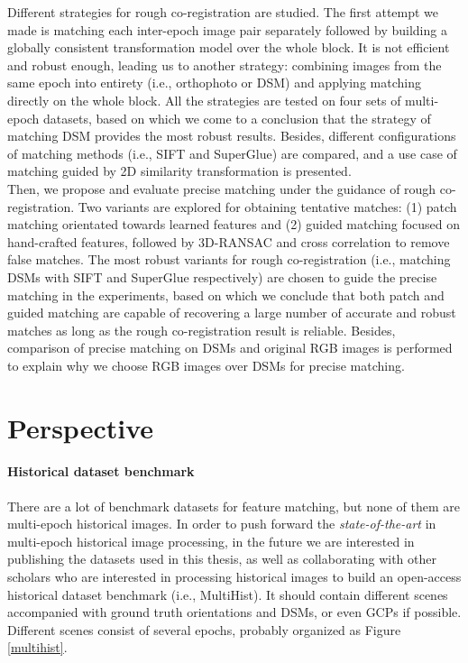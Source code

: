 Different strategies for rough co-registration are studied. The first attempt we made is matching each inter-epoch image pair separately followed by building a globally consistent transformation model over the whole block. It is not efficient and robust enough, leading us to another strategy: combining images from the same epoch into entirety (i.e., orthophoto or \ac{DSM}) and applying matching directly on the whole block. All the strategies are tested on four sets of multi-epoch datasets, based on which we come to a conclusion that the strategy of matching \ac{DSM} provides the most robust results. Besides, different configurations of matching methods (i.e., SIFT and SuperGlue) are compared, and a use case of matching guided by 2D similarity transformation is presented.\\

Then, we propose and evaluate precise matching under the guidance of rough co-registration. Two variants are explored for obtaining tentative matches: (1) patch matching orientated towards learned features and (2) guided matching focused on hand-crafted features, followed by 3D-RANSAC and cross correlation to remove false matches. 
The most robust variants for rough co-registration (i.e., matching \ac{DSM}s with SIFT and SuperGlue respectively) are chosen to guide the precise matching in the experiments, based on which we conclude that both patch and guided matching are capable of recovering a large number of accurate and robust matches as long as the rough co-registration result is reliable. 
Besides, comparison of precise matching on \ac{DSM}s and original RGB images is performed to explain why we choose RGB images over \ac{DSM}s for precise matching.


\section{Perspective}
\paragraph{Historical dataset benchmark}
There are a lot of benchmark datasets for feature matching, but none of them are multi-epoch historical images. 
In order to push forward the \textit{state-of-the-art} in multi-epoch historical image processing, in the future we are interested in publishing the datasets used in this thesis, as well as collaborating with other scholars who are interested in processing historical images to build an open-access historical dataset benchmark (i.e., MultiHist). 
It should contain different scenes accompanied with ground truth orientations and \ac{DSM}s, or even \ac{GCP}s if possible. Different scenes consist of several epochs, probably organized as Figure \ref{multihist}. 

